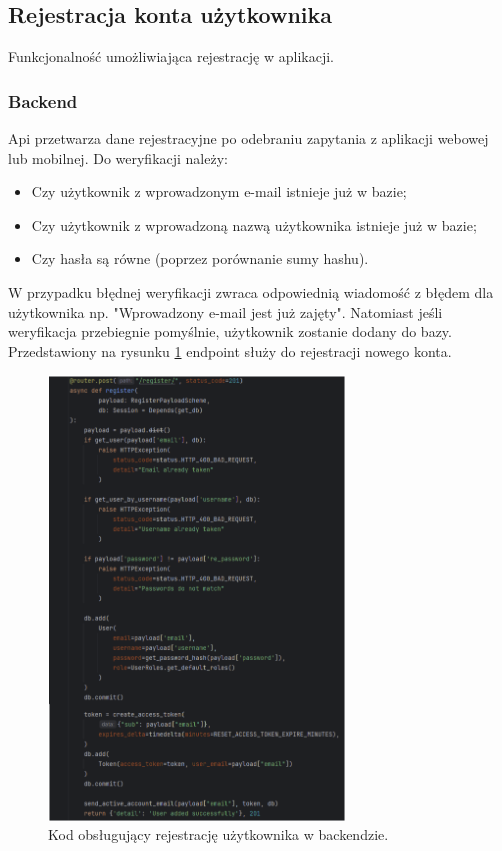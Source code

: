 
\subsection{Rejestracja konta użytkownika}
Funkcjonalność umożliwiająca rejestrację w aplikacji.

\subsubsection{Backend}
Api przetwarza dane rejestracyjne po odebraniu zapytania z aplikacji webowej lub mobilnej. Do weryfikacji należy:

\begin{itemize}
    \item Czy użytkownik z wprowadzonym e-mail istnieje już w bazie;
    \item Czy użytkownik z wprowadzoną nazwą użytkownika istnieje już w bazie;
    \item Czy hasła są równe (poprzez porównanie sumy hashu).
\end{itemize}

W przypadku błędnej weryfikacji zwraca odpowiednią wiadomość z błędem dla użytkownika np. "Wprowadzony e-mail jest już zajęty". Natomiast jeśli weryfikacja przebiegnie pomyślnie, użytkownik zostanie dodany do bazy. Przedstawiony na rysunku \ref{img:rejestracja_backend} endpoint służy do rejestracji nowego konta.

\begin{figure}[H]
    \centering
    \includegraphics[width=0.7\textwidth]{chapters/chapter_8/screens/rejestracja_backend}
    \caption{Kod obsługujący rejestrację użytkownika w backendzie.}
    \label{img:rejestracja_backend}
\end{figure}

